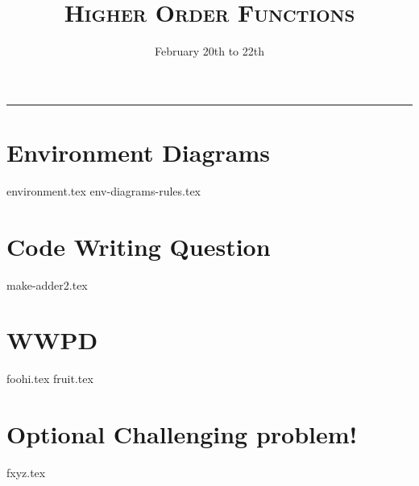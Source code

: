 \documentclass{exam}
\title{\textsc{Higher Order Functions}}
\date{February 20th to 22th}
\begin{document}
\maketitle
\rule{\textwidth}{0.15em}
\fontsize{12}{15}\selectfont



\section{Environment Diagrams}
\begin{questions}
{environment.tex}
\newpage
{env-diagrams-rules.tex}

\end{questions}


\newpage
\section{Code Writing Question}
\begin{questions}
{make-adder2.tex}

\newpage
\section{WWPD}
\begin{questions}
{foohi.tex}
\newpage
{fruit.tex}
\end{questions}

\newpage
\section{Optional Challenging problem!}
{fxyz.tex}

\end{questions}
\end{document}
